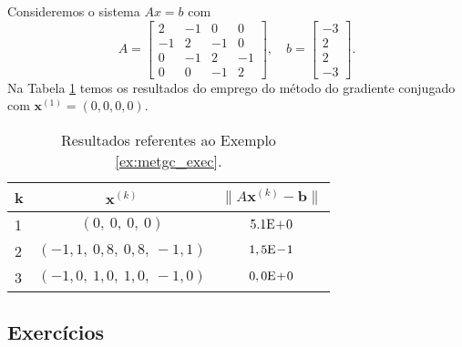 \begin{ex}\label{ex:metgc_exec}
  Consideremos o sistema $Ax = b$ com
  \begin{equation}
    A =
    \begin{bmatrix}
      2 & -1 & 0 & 0\\
      -1 & 2 & -1 & 0\\
      0 & -1 & 2 & -1 \\
      0 & 0 & -1 & 2
    \end{bmatrix},\quad
    b =
    \begin{bmatrix}
      -3\\
      2\\
      2\\
      -3
    \end{bmatrix}.
  \end{equation}
  Na Tabela \ref{tab:metgc_exec} temos os resultados do emprego do método do gradiente conjugado com $\pmb{x}^{(1)} = (0, 0, 0, 0)$.

  \begin{table}[h!]
    \centering
    \caption{Resultados referentes ao Exemplo \ref{ex:metgc_exec}.}
    \label{tab:metgc_exec}
    \begin{tabular}{l|c|c}
      k & $\pmb{x}^{(k)}$ & $\|A\pmb{x}^{(k)}-\pmb{b}\|$\\\hline
      1 & $(0,~0,~0,~0)$ & $5.1\mathrm{E}\!+\!0$\\
      2 & $(-1,1,~0,8,~0,8,~-1,1)$ & $1,5\mathrm{E}\!-\!1$\\
      3 & $(-1,0,~1,0,~1,0,~-1,0)$ & $0,0\mathrm{E}\!+\!0$\\\hline
    \end{tabular}
  \end{table}

% 
\end{ex}

\subsection*{Exercícios}

\emconstrucao